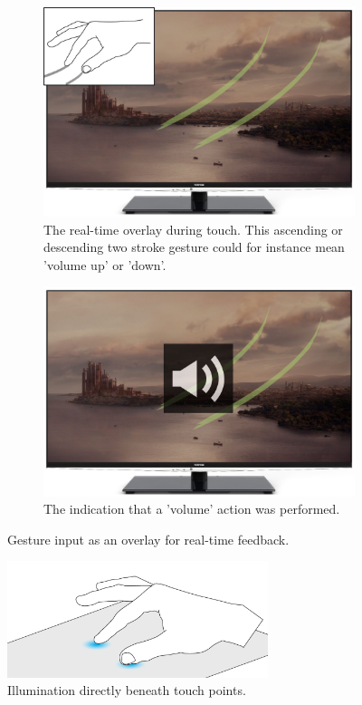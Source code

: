 \begin{figure}[h]
  \centering
  \begin{subfigure}[t]{.45\textwidth}
    \centering
    \includegraphics[width=.9\linewidth]{figures/touch/evaluation/gesture_overlay}
    \caption{The real-time overlay during touch. This ascending or descending two stroke gesture could for instance mean 'volume up' or 'down'.}
  \end{subfigure}%
  \hspace{1cm}
  \begin{subfigure}[t]{.45\textwidth}
    \centering
    \includegraphics[width=.9\linewidth]{figures/touch/evaluation/gesture_overlay_2}
    \caption{The indication that a 'volume' action was performed.}
  \end{subfigure}
  \caption{Gesture input as an overlay for real-time feedback.}
  \label{fig:textiletouch:eval:overlay}
\end{figure}

\begin{figure}[h]
  \centering
      \includegraphics[width=3in]{figures/touch/evaluation/backlid_textile}
  \caption[Illumination directly beneath touch points.]
  {Illumination directly beneath touch points.}
  \label{fig:textiletouch:eval:backlighting}
\end{figure}

